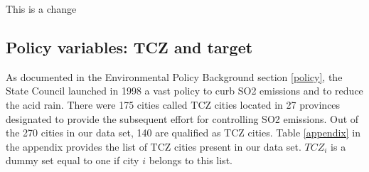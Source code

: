 \documentclass[12pt]{article}
\begin{document}
This is a change

\subsection{Policy variables: TCZ and target}


As documented in the Environmental Policy Background section \ref{policy}, the State Council launched in 1998 a vast policy to curb SO2 emissions and to reduce the acid rain. There were 175 cities called TCZ cities located in 27 provinces designated to provide the subsequent effort for controlling SO2 emissions. Out of the 270 cities in our data set, 140 are qualified as TCZ cities. Table \ref{appendix} in the appendix provides the list of TCZ cities present in our data set. $TCZ_{i}$ is a dummy set equal to one if city $i$ belongs to this list. 
\end{document}
